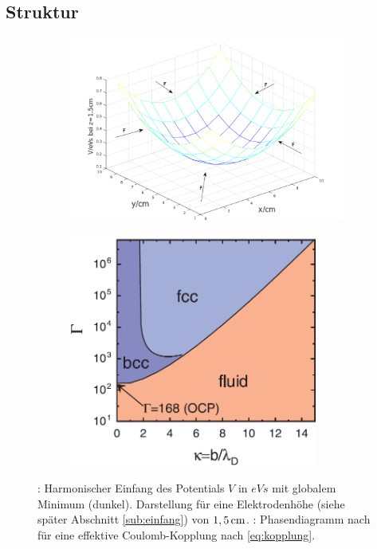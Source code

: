        \subsection{Struktur}

           \begin{figure}[!t]
            \centering
            \begin{subfigure}[t]{0.48\textwidth}
              \centering
              \includegraphics[width=1.1\textwidth,height=0.3\textheight]{figs/einfangpotnu.png}
              \caption{}
              \label{img:potential}
            \end{subfigure}
            \begin{subfigure}[t]{0.48\textwidth}
              \centering
              \includegraphics[width=0.9\textwidth,height=0.3\textheight]{figs/gammaphasetransmelzer.png}
              \caption{}
              \label{img:gamma}
            \end{subfigure}
            \caption{: Harmonischer Einfang des Potentials $V$ in $\unit{eVs}$ mit globalem Minimum (dunkel). Darstellung für eine Elektrodenhöhe (siehe später Abschnitt \ref{sub:einfang}) von $\unit[1,5]{cm}$. : Phasendiagramm nach \cite{Melzer12} für eine effektive Coulomb-Kopplung nach \autoref{eq:kopplung}.}
           \end{figure}

